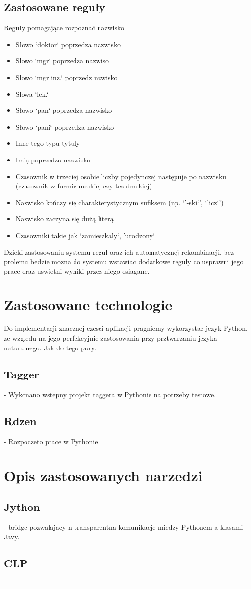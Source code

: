 \documentclass[12pt]{article}
\begin{document}
\subsection{Zastosowane reguły}
Reguły pomagające rozpoznać nazwisko:
\begin{itemize}
\item Słowo `doktor` poprzedza nazwisko
\item Slowo `mgr` poprzedza nazwiso
\item Slowo `mgr inz.` poprzedz nzwisko
\item Slowa `lek.`
\item Słowo `pan` poprzedza nazwisko
\item Słowo `pani` poprzedza nazwisko
\item Inne tego typu tytuly
\item Imię poprzedza nazwisko
\item Czasownik w trzeciej osobie liczby pojedynczej następuje po nazwisku (czasownik w formie meskiej czy tez dmskiej)
\item Nazwisko kończy się charakterystycznym sufiksem (np. `'-ski`', `'icz`')
\item Nazwisko zaczyna się dużą literą
\item Czasowniki takie jak `zamieszkaly`, 'urodzony`
\end{itemize}
Dzieki zastosowaniu systemu regul oraz ich automatycznej rekombinacji, bez prolemu bedzie mozna do systemu wstawiac dodatkowe reguly co usprawni jego prace oraz uswietni wyniki przez niego osiagane.

\section{Zastosowane technologie}
Do implementacji znacznej czesci aplikacji pragniemy wykorzystac jezyk Python, ze wzgledu na jego perfekcyjnie zastosowania przy prztwarzaniu jezyka naturalnego. Jak do tego pory:
\subsection {Tagger} - Wykonano wstepny projekt taggera w Pythonie na potrzeby testowe.
\subsection {Rdzen} - Rozpoczeto prace  w Pythonie
\section{Opis zastosowanych narzedzi}
\subsection{Jython} - bridge pozwalajacy n transparentna komunikacje miedzy Pythonem a klasami Javy.
\subsection{CLP} - 
\end{document}

